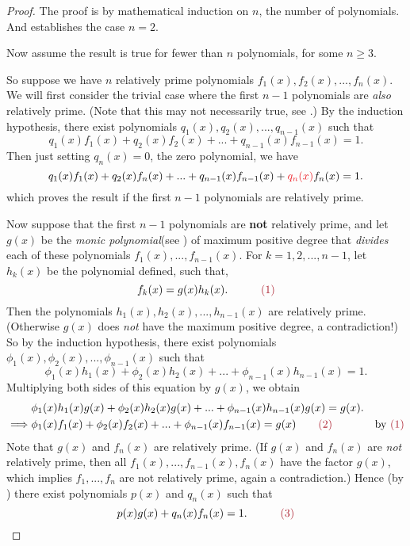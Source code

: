 \begin{proof}
The proof is by mathematical induction on \(n\), the number of polynomials.
And  establishes the case \(n = 2\).

Now assume the result is true for fewer than \(n\) polynomials, for some \(n \ge 3\).

So suppose we have \(n\) relatively prime polynomials \(f_1(x), f_2(x), ..., f_n(x)\).
We will first consider the trivial case where the first \(n - 1\) polynomials are \emph{also} relatively prime.
(Note that this may not necessarily true, see .)
By the induction hypothesis, there exist polynomials \(q_1(x), q_2(x), ..., q_{n - 1}(x)\) such that
\[
    q_1(x)f_1(x) + q_2(x)f_2(x) + ... + q_{n-1}(x)f_{n-1}(x) = 1.
\]
Then just setting \(q_n(x) = 0\), the zero polynomial, we have
\[
    q_1(x)f_1(x) + q_2(x)f_n(x) + ... + q_{n-1}(x)f_{n-1}(x) + \RED{q_n(x)}f_n(x) = 1.
\]
which proves the result if the first \(n - 1\) polynomials are relatively prime.

Now suppose that the first \(n - 1\) polynomials are \textbf{not} relatively prime, and let \(g(x)\) be the \emph{monic polynomial}(see ) of maximum positive degree that \emph{divides} each of these polynomials \(f_1(x), ..., f_{n - 1}(x)\).
For \(k = 1, 2, ..., n - 1\), let \(h_k(x)\) be the polynomial defined, such that,
\[
    f_k(x) = g(x)h_k(x). \quad \quad \quad \MAROON{(1)}
\]
Then the polynomials \(h_1(x), h_2(x), ..., h_{n - 1}(x)\) are relatively prime.
(Otherwise \(g(x)\) does \emph{not} have the maximum positive degree, a contradiction!)
So by the induction hypothesis, there exist polynomials \(\phi_1(x), \phi_2(x), ..., \phi_{n-1}(x)\) such that
\[
    \phi_1(x)h_1(x) + \phi_2(x)h_2(x) + ... + \phi_{n-1}(x)h_{n - 1}(x) = 1.
\]
Multiplying both sides of this equation by \(g(x)\), we obtain
\begin{align*}
             & \phi_1(x)h_1(x)g(x) + \phi_2(x)h_2(x)g(x) + ... + \phi_{n-1}(x)h_{n - 1}(x)g(x) = g(x). \\
    \implies & \phi_1(x)f_1(x) + \phi_2(x)f_2(x) + ... + \phi_{n-1}(x)f_{n-1}(x) = g(x) \quad \quad \MAROON{(2)} & \text{by \MAROON{(1)}}
\end{align*}
Note that \(g(x)\) and \(f_n(x)\) are relatively prime.
(If \(g(x)\) and \(f_n(x)\) are \emph{not} relatively prime, then all \(f_1(x), ..., f_{n-1}(x), f_n(x)\) have the factor \(g(x)\), which implies \(f_1, ..., f_n\) are not relatively prime, again a contradiction.)
Hence (by ) there exist polynomials \(p(x)\) and \(q_n(x)\) such that
\[
    p(x)g(x) + q_n(x)f_n(x) = 1. \quad \quad \quad \MAROON{(3)}
\]


\end{proof}
